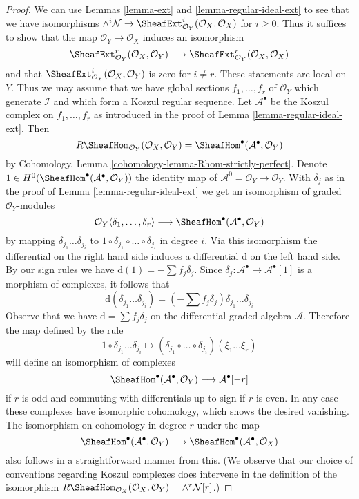 \begin{proof}
We can use Lemmas \ref{lemma-ext} and \ref{lemma-regular-ideal-ext}
to see that we have isomorphisms
$\wedge^i\mathcal{N} \to
\SheafExt^i_{\mathcal{O}_Y}(\mathcal{O}_X, \mathcal{O}_X)$
for $i \geq 0$. Thus it suffices to show that the map
$\mathcal{O}_Y \to \mathcal{O}_X$ induces an isomorphism
$$
\SheafExt^r_{\mathcal{O}_Y}(\mathcal{O}_X, \mathcal{O}_Y)
\longrightarrow
\SheafExt^r_{\mathcal{O}_Y}(\mathcal{O}_X, \mathcal{O}_X)
$$
and that
$\SheafExt^i_{\mathcal{O}_Y}(\mathcal{O}_X, \mathcal{O}_Y)$
is zero for $i \not = r$. These statements are local on $Y$. Thus
we may assume that we have global sections $f_1, \ldots, f_r$ of
$\mathcal{O}_Y$ which generate $\mathcal{I}$ and which form a
Koszul regular sequence. Let $\mathcal{A}^\bullet$
be the Koszul complex on $f_1, \ldots, f_r$ as introduced in the proof of
Lemma \ref{lemma-regular-ideal-ext}. Then
$$
R\SheafHom_{\mathcal{O}_Y}(\mathcal{O}_X, \mathcal{O}_Y) =
\SheafHom^\bullet(\mathcal{A}^\bullet, \mathcal{O}_Y)
$$
by Cohomology, Lemma \ref{cohomology-lemma-Rhom-strictly-perfect}.
Denote $1 \in H^0(\SheafHom^\bullet(\mathcal{A}^\bullet, \mathcal{O}_Y))$
the identity map of $\mathcal{A}^0 = \mathcal{O}_Y \to \mathcal{O}_Y$.
With $\delta_j$ as in the proof of Lemma \ref{lemma-regular-ideal-ext}
we get an isomorphism of graded $\mathcal{O}_Y$-modules
$$
\mathcal{O}_Y\langle \delta_1, \ldots, \delta_r\rangle
\longrightarrow
\SheafHom^\bullet(\mathcal{A}^\bullet, \mathcal{O}_Y)
$$
by mapping $\delta_{j_1} \ldots \delta_{j_i}$ to
$1 \circ \delta_{j_1} \circ \ldots \circ \delta_{j_i}$ in degree $i$.
Via this isomorphism the differential on the right hand side
induces a differential $\text{d}$ on the left hand side.
By our sign rules we have $\text{d}(1) = - \sum f_j \delta_j$.
Since $\delta_j : \mathcal{A}^\bullet \to \mathcal{A}^\bullet[1]$
is a morphism of complexes, it follows that
$$
\text{d}(\delta_{j_1} \ldots \delta_{j_i}) =
(- \sum f_j \delta_j )\delta_{j_1} \ldots \delta_{j_i}
$$
Observe that we have $\text{d} = \sum f_j \delta_j$ on the differential
graded algebra $\mathcal{A}$. Therefore the map defined by the rule
$$
1 \circ \delta_{j_1} \ldots \delta_{j_i} \longmapsto
(\delta_{j_1} \circ \ldots \circ \delta_{j_i})(\xi_1 \ldots \xi_r)
$$
will define an isomorphism of complexes
$$
\SheafHom^\bullet(\mathcal{A}^\bullet, \mathcal{O}_Y)
\longrightarrow \mathcal{A}^\bullet[-r]
$$
if $r$ is odd and commuting with differentials up to sign if $r$ is even.
In any case these complexes have isomorphic cohomology, which shows the
desired vanishing. The isomorphism on cohomology in degree $r$
under the map
$$
\SheafHom^\bullet(\mathcal{A}^\bullet, \mathcal{O}_Y)
\longrightarrow
\SheafHom^\bullet(\mathcal{A}^\bullet, \mathcal{O}_X)
$$
also follows in a straightforward manner from this.
(We observe that our choice of conventions regarding
Koszul complexes does intervene in the definition
of the isomorphism
$R\SheafHom_{\mathcal{O}_X}(\mathcal{O}_X, \mathcal{O}_Y) =
\wedge^r \mathcal{N}[r]$.)
\end{proof}

